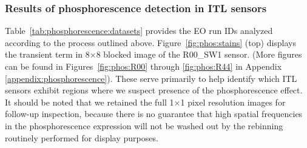 \subsubsection{Results of phosphorescence detection in ITL sensors}\label{phos-results}

Table~\ref{tab:phosphorescence:datasets} provides the EO run IDs analyzed according to the process outlined above. Figure~\ref{fig:phos:stains} (top) displays the transient term in 8$\times$8 blocked image of the R00\_SW1 sensor. (More figures can be found in  Figures~\ref{fig:phos:R00} through \ref{fig:phos:R44} in Appendix \ref{appendix:phosphorescence}). These serve primarily to help identify which ITL sensors exhibit regions where we suspect presence of the phosphorescence effect. It should be noted that we retained the full 
1$\times$1 
pixel resolution images for follow-up inspection, because there is no guarantee that high spatial frequencies in the phosphorescence expression will not be washed out by the rebinning routinely performed for display purposes.

